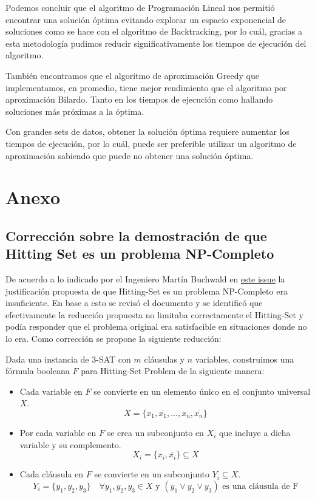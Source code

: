 \documentclass{estilo}
\begin{document}
Podemos concluir que el algoritmo de Programación Lineal nos permitió encontrar una solución óptima evitando explorar un espacio exponencial de soluciones como se hace con el algoritmo de Backtracking, por lo cuál, gracias a esta metodología pudimos reducir significativamente los tiempos de ejecución del algoritmo.

También encontramos que el algoritmo de aproximación Greedy que implementamos, en promedio, tiene mejor rendimiento que el algoritmo por aproximación Bilardo. Tanto en los tiempos de ejecución como hallando soluciones más próximas a la óptima.

Con grandes sets de datos, obtener la solución óptima requiere aumentar los tiempos de ejecución, por lo cuál, puede ser preferible utilizar un algoritmo de aproximación sabiendo que puede no obtener una solución óptima. 

\newpage
\section{Anexo}
\subsection{Corrección sobre la demostración de que Hitting Set es un problema NP-Completo}
De acuerdo a lo indicado por el Ingeniero Martín Buchwald en \href{https://github.com/mrti259/tda-i-tps/issues/2#issuecomment-1858235695}{este issue} la justificación propuesta de que Hitting-Set es un problema NP-Completo era insuficiente. En base a esto se revisó el documento y se identificó que efectivamente la reducción propuesta no limitaba correctamente el Hitting-Set y podía responder que el problema original era satisfacible en situaciones donde no lo era. Como corrección se propone la siguiente reducción:

Dada una instancia de 3-SAT con $m$ cláusulas y $n$ variables, construimos una fórmula booleana \(F\) para Hitting-Set Problem de la siguiente manera:

\begin{itemize}
    \item Cada variable en $F$ se convierte en un elemento único en el conjunto universal \(X\).
    \[X = \{x_1, \overline{x_1}, ..., x_n, \overline{x_n}\}\]
    
    \item Por cada variable en $F$ se crea un subconjunto en \(X_i\) que incluye a dicha variable y su complemento.
    \[X_i = \{x_i, \overline{x_i}\} \subseteq X\]
    
    \item Cada cláusula en $F$ se convierte en un subconjunto \(Y_i \subseteq X\).
    \[Y_i = \{y_1, y_2, y_3\} \quad \forall y_1, y_2, y_3 \in X \text{ y } (y_1 \lor y_2 \lor y_3) \text{ es una cláusula de F} \]
\end{itemize}
\end{document}
